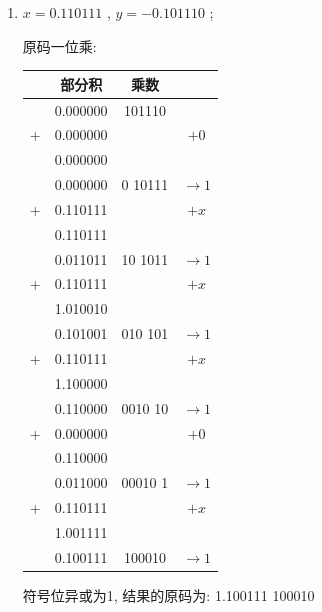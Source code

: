 \documentclass[UTF8]{report}
\newcommand{\ra}{\rightarrow}
\newenvironment{solution}{{\noindent\hskip 2em \bf 解 \quad}}{}
\begin{document}
\begin{solution}
    \begin{enumerate}
        \item $x=  0.110 111$ ,  $y= -0.101 110$ ;
        
        原码一位乘:
        \begin{tabular}{cc|c|c}
             & 部分积     & 乘数     & \\
            \hline
             & 0.000000 & 101110  &         \\
            +& 0.000000 &         & $+0$    \\
            \hline
             & 0.000000 &         &         \\
             & 0.000000 & 0 10111 & $\ra 1$ \\
            +& 0.110111 &  & $+x$    \\
            \hline
             & 0.110111 &  &         \\
             & 0.011011 & 10 1011 & $\ra 1$ \\
            +& 0.110111 &  & $+x$    \\
            \hline
             & 1.010010 &  &         \\
             & 0.101001 & 010 101 & $\ra 1$ \\
            +& 0.110111 &  & $+x$    \\
            \hline
             & 1.100000 &  &         \\
             & 0.110000 & 0010 10 & $\ra 1$ \\
            +& 0.000000 &  & $+0$    \\
            \hline
             & 0.110000 &  &         \\
             & 0.011000 & 00010 1 & $\ra 1$ \\
            +& 0.110111 &  & $+x$    \\
            \hline
             & 1.001111 &  &         \\
             & 0.100111 & 100010  & $\ra 1$ \\
        \end{tabular}

        符号位异或为1, 结果的原码为: 1.100111 100010
        

\end{enumerate}
\end{solution}
\end{document}
